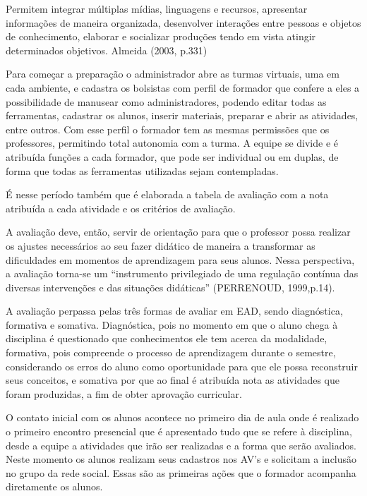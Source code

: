 \begin{citacao}
Permitem integrar múltiplas mídias, linguagens e recursos, apresentar informações de maneira organizada, desenvolver interações entre pessoas e objetos de conhecimento, elaborar e socializar produções tendo em vista atingir determinados objetivos. Almeida (2003, p.331)
\end{citacao}

Para começar a preparação o administrador abre as turmas virtuais, uma em cada ambiente, e cadastra os bolsistas com perfil de formador que confere a eles a possibilidade de manusear como administradores, podendo editar todas as ferramentas, cadastrar os alunos, inserir materiais, preparar e abrir as atividades, entre outros. Com esse perfil o formador tem as mesmas permissões que os professores, permitindo total autonomia com a turma. A equipe se divide e é atribuída funções a cada formador, que pode ser individual ou em duplas, de forma que todas as ferramentas utilizadas sejam contempladas.

É nesse período também que é elaborada a tabela de avaliação com a nota atribuída a cada atividade e os critérios de avaliação. 

\begin{citacao}
A avaliação deve, então, servir de orientação para que o professor possa realizar os ajustes necessários ao seu fazer didático de maneira a transformar as dificuldades em momentos de aprendizagem para seus alunos. Nessa perspectiva, a avaliação torna-se um ``instrumento privilegiado de uma regulação contínua das diversas intervenções e das situações didáticas'' (PERRENOUD, 1999,p.14). 
\end{citacao}

A avaliação perpassa pelas três formas de avaliar em EAD, sendo diagnóstica, formativa e somativa. Diagnóstica, pois no momento em que o aluno chega à disciplina é questionado que conhecimentos ele tem acerca da modalidade, formativa, pois compreende o processo de aprendizagem durante o semestre, considerando os erros do aluno como oportunidade para que ele possa reconstruir seus conceitos, e somativa por que ao final é atribuída nota as atividades que foram produzidas, a fim de obter aprovação curricular.

O contato inicial com os alunos acontece no primeiro dia de aula onde é realizado o primeiro encontro presencial que é apresentado tudo que se refere à disciplina, desde a equipe a atividades que irão ser realizadas e a forma que serão avaliados. Neste momento os alunos realizam seus cadastros nos AV’s e solicitam a inclusão no grupo da rede social. Essas são as primeiras ações que o formador acompanha diretamente os alunos. 

